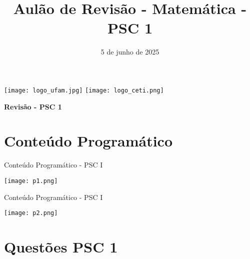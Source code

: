 \documentclass[aspectratio=169]{beamer}
\title[CETi Gilberto Mestrinho]{Aulão de Revisão - Matemática - PSC 1}
\date{5 de junho de 2025}
\begin{document}
\justifying
\onehalfspacing

\begin{frame}
    \begin{titlepage}
    \centering
    \vspace*{1cm} %
    
    \noindent%
    \hspace*{0.3\paperwidth}%
    \texttt{[image: logo\_ufam.jpg]}%
    \hfill%
    \texttt{[image: logo\_ceti.png]}%
    \hspace*{0.3\paperwidth}%
    
    \vspace{0.1cm} %
    
    {\Large\textbf{Revisão - PSC 1}} \\ %
    \vspace{1cm}
    
    \vfill %
    \end{titlepage}
\end{frame}

\section{Conteúdo Programático}

\begin{frame}{Conteúdo Programático - PSC I}

    \begin{center}
        \texttt{[image: p1.png]}
    \end{center}
    
\end{frame}

\begin{frame}{Conteúdo Programático - PSC I}

    \begin{center}
        \texttt{[image: p2.png]}
    \end{center}
    
\end{frame}

\section{Questões PSC 1}
\end{document}
